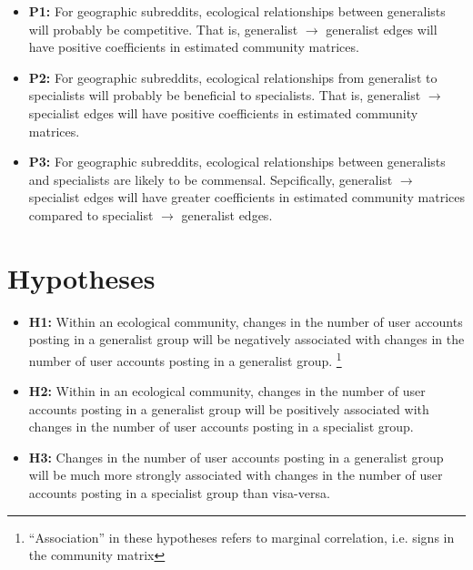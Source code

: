 \documentclass[12pt]{memoir}
\begin{document}
\begin{itemize}
\item \textbf{P1:} For geographic subreddits, ecological relationships between generalists will probably be competitive. That is, generalist $\rightarrow$ generalist edges will have positive coefficients in estimated community matrices. 

\item \textbf{P2:} For geographic subreddits, ecological relationships from generalist to specialists will probably be beneficial to specialists. That is, generalist $\rightarrow$ specialist edges will have positive coefficients in estimated community matrices.

\item \textbf{P3:} For geographic subreddits, ecological relationships between generalists and specialists are likely to be commensal. Sepcifically, generalist $\rightarrow$ specialist edges will have greater coefficients in estimated community matrices compared to specialist $\rightarrow$ generalist edges. 

\end{itemize}

\section{Hypotheses}
\begin{itemize}

\item \textbf{H1:} Within an ecological community, changes in the number of user accounts posting in a generalist group will be negatively associated with changes in the number of user accounts posting in a generalist group.  \footnote{``Association'' in these hypotheses refers to marginal correlation, i.e. signs in the community matrix}

\item \textbf{H2:} Within in an ecological community, changes in the number of user accounts posting in a generalist group will be positively associated with changes in the number of user accounts posting in a specialist group.

\item \textbf{H3:} Changes in the number of user accounts posting in a generalist group will be much more strongly associated with changes in the number of user accounts posting in a specialist group than visa-versa.

\end{itemize}
\end{document}
